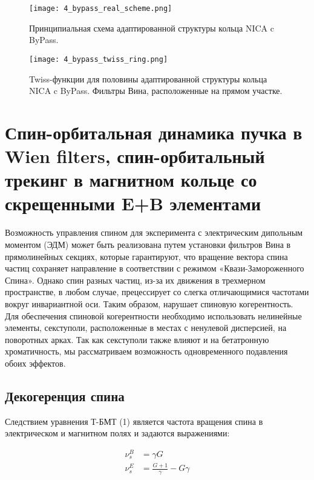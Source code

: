 \begin{figure}[!h]
  \centering
   \texttt{[image: 4\_bypass\_real\_scheme.png]}
   \caption{Принципиальная схема адаптированной структуры кольца NICA c ByPass.}
   \label{fig:4_bypass_real_scheme}
\end{figure}

\begin{figure}[!h]
  \centering
   \texttt{[image: 4\_bypass\_twiss\_ring.png]}
   \caption{Twiss-функции для половины адаптированной структуры кольца NICA c ByPass. Фильтры Вина, расположенные на прямом участке.}
   \label{fig:4_bypass_twiss_ring}
\end{figure}

\newpage
\section{Спин-орбитальная динамика пучка в Wien filters, спин-орбитальный трекинг в магнитном кольце со скрещенными E+B элементами}\label{sec:EDM/Wien_filter_tracking}

\par Возможность управления спином для эксперимента с электрическим дипольным моментом (ЭДМ) может быть реализована путем установки фильтров Вина в прямолинейных секциях, которые гарантируют, что вращение вектора спина частиц сохраняет направление в соответствии с режимом «Квази-Замороженного Спина». Однако спин разных частиц, из-за их движения в трехмерном пространстве, в любом случае, прецессирует со слегка отличающимися частотами вокруг инвариантной оси. Таким образом, нарушает спиновую когерентность. Для обеспечения спиновой когерентности необходимо использовать нелинейные элементы, секступоли, расположенные в местах с ненулевой дисперсией, на поворотных арках. Так как секступоли также влияют и на бетатронную хроматичность, мы рассматриваем возможность одновременного подавления обоих эффектов.

\subsection{Декогеренция спина}\label{sec:EDM/Wien_filter_tracking/decoherence}

Следствием уравнения Т-БМТ (1) является частота вращения спина в электрическом и магнитном полях и задаются выражениями:

\begin{equation}
\begin{aligned}
\nu_{s}^{B} &= \gamma G \\
\nu_{s}^{E} &= \frac{G+1}{\gamma}-G \gamma
\end{aligned}
\end{equation}



